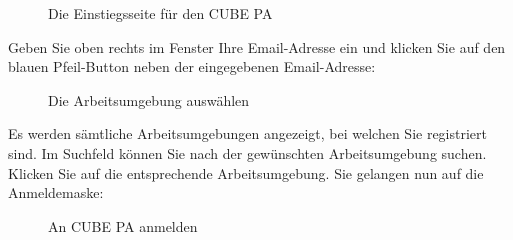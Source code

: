 \begin{figure}[H]
\caption{Die Einstiegsseite für den CUBE PA}
\end{figure}

Geben Sie oben rechts im Fenster Ihre Email-Adresse ein und klicken Sie auf den blauen Pfeil-Button neben der eingegebenen Email-Adresse:

\begin{figure}[H]
\caption{Die Arbeitsumgebung auswählen}
\end{figure}

Es werden sämtliche Arbeitsumgebungen angezeigt, bei welchen Sie registriert sind. Im Suchfeld können Sie nach der gewünschten Arbeitsumgebung suchen. Klicken Sie auf die entsprechende Arbeitsumgebung. Sie gelangen nun auf die Anmeldemaske:

\begin{figure}[H]
\caption{An CUBE PA anmelden}
\end{figure}

